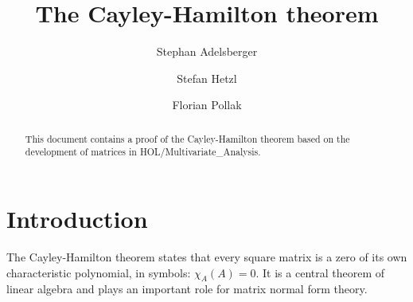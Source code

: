 \documentclass[11pt,a4paper]{article}
\begin{document}
\title{The Cayley-Hamilton theorem}
\author{Stephan Adelsberger \and Stefan Hetzl \and Florian Pollak}
\maketitle


\begin{abstract}
This document contains a proof of the Cayley-Hamilton theorem based on the development of matrices in HOL/Multivariate\_Analysis.
\end{abstract}

\tableofcontents

\section{Introduction}\label{subsec:intro}

The Cayley-Hamilton theorem states that every square matrix is a zero of its own characteristic polynomial, in symbols: $\chi_A(A) = 0$.
It is a central theorem of linear algebra and plays an important role for matrix normal form theory.
\end{document}
